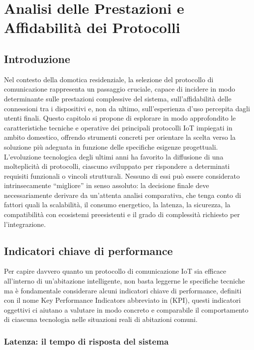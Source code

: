 \chapter{Analisi delle Prestazioni e Affidabilità dei Protocolli}

\section{Introduzione}

Nel contesto della domotica residenziale, la selezione del protocollo di comunicazione rappresenta un passaggio cruciale, capace di incidere in modo determinante sulle prestazioni complessive del sistema, sull’affidabilità delle connessioni tra i dispositivi e, non da ultimo, sull’esperienza d’uso percepita dagli utenti finali. Questo capitolo si propone di esplorare in modo approfondito le caratteristiche tecniche e operative dei principali protocolli IoT impiegati in ambito domestico, offrendo strumenti concreti per orientare la scelta verso la soluzione più adeguata in funzione delle specifiche esigenze progettuali.\\

L’evoluzione tecnologica degli ultimi anni ha favorito la diffusione di una molteplicità di protocolli, ciascuno sviluppato per rispondere a determinati requisiti funzionali o vincoli strutturali. Nessuno di essi può essere considerato intrinsecamente “migliore” in senso assoluto: la decisione finale deve necessariamente derivare da un’attenta analisi comparativa, che tenga conto di fattori quali la scalabilità, il consumo energetico, la latenza, la sicurezza, la compatibilità con ecosistemi preesistenti e il grado di complessità richiesto per l’integrazione.

\section{Indicatori chiave di performance}

Per capire davvero quanto un protocollo di comunicazione IoT sia efficace all’interno di un’abitazione intelligente, non basta leggerne le specifiche tecniche ma è fondamentale considerare alcuni indicatori chiave di performance, definiti con il nome Key Performance Indicators abbreviato in  (KPI), questi indicatori oggettivi ci  aiutano a valutare in modo concreto e comparabile il comportamento di ciascuna tecnologia nelle situazioni reali di abitazioni comuni.

\subsection{Latenza: il tempo di risposta del sistema}

